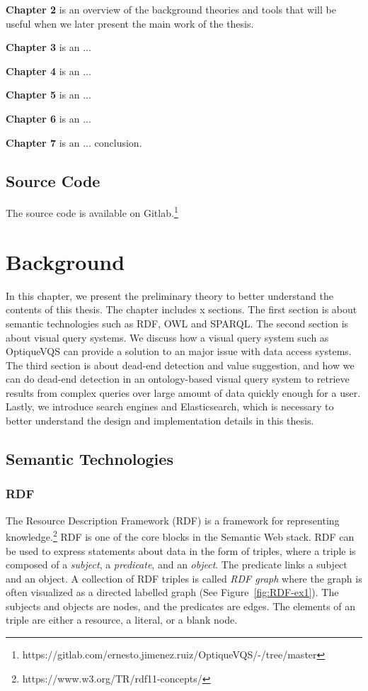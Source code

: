 \documentclass[a4paper,english]{ifimaster/ifimaster}
\begin{document}
\textbf{Chapter 2} is an overview of the background theories and tools that will be useful when we later present the main work of the thesis.


\noindent \textbf{Chapter 3} is an ...

\noindent \textbf{Chapter 4} is an ...

\noindent \textbf{Chapter 5} is an ...

\noindent \textbf{Chapter 6} is an ...

\noindent \textbf{Chapter 7} is an ... conclusion.


\section{Source Code}
The source code is available on Gitlab.\footnote{https://gitlab.com/ernesto.jimenez.ruiz/OptiqueVQS/-/tree/master}


\chapter{Background}
In this chapter, we present the preliminary theory to better understand the contents of this thesis. The chapter includes x sections. 
The first section is about semantic technologies such as RDF, OWL and SPARQL. The second section is about visual query systems. We discuss how a visual query system
such as OptiqueVQS can provide a solution to an major issue with data access systems. The third section is about dead-end detection and value suggestion, and how we can do dead-end detection in an ontology-based visual query system to retrieve results from complex queries over large amount of data quickly enough for a user.
Lastly, we introduce search engines and Elasticsearch, which is necessary to better understand the design and implementation details in this thesis. 
\section{Semantic Technologies}
\subsection{RDF}
The Resource Description Framework (RDF) is a framework for representing knowledge.\footnote{https://www.w3.org/TR/rdf11-concepts/} RDF is one of the core blocks in the Semantic Web stack. RDF can be used to express statements about data in the form of triples, where a triple is composed of a \textit{subject}, a \textit{predicate}, and an \textit{object}. The predicate links a subject and an object. A collection of RDF triples is called \textit{RDF graph} where the graph is often visualized as a directed labelled graph (See Figure~\ref{fig:RDF-ex1}). The subjects and objects are nodes, and the predicates are edges. The elements of an triple are either a resource, a literal, or a blank node.~\cite{RDF_W3C} 
\end{document}
